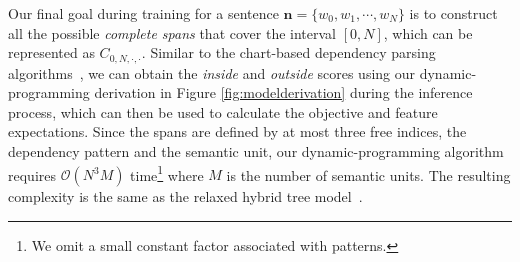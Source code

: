 Our final goal during training for a sentence $\boldsymbol{n}=\{w_0, w_1,\cdots, w_N\}$ is to construct all the possible {\em complete spans} that cover the interval $[0, N]$, which can be represented as $C_{0,N,\cdot, \cdot}$. 
Similar to the chart-based dependency parsing algorithms~\cite{eisner1996three,eisner2000bilexical,koo2010efficient}, we can obtain the {\em inside} and {\em outside} scores using our dynamic-programming derivation in Figure \ref{fig:modelderivation} during the inference process,
which can then be used to calculate the objective and feature expectations. 
Since the spans are defined by at most three free indices, the dependency pattern and the semantic unit, our dynamic-programming algorithm requires $\mathcal{O}(N^3M)$ time\footnote{We omit a small constant factor associated with patterns.} where $M$ is the number of semantic units. 
The resulting complexity is the same as the {relaxed hybrid tree} model~\cite{lu2014semantic}. 


%
%
%
%
%
%

